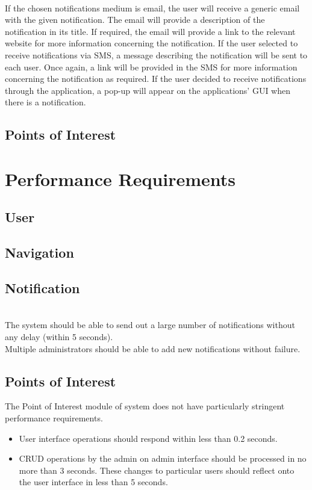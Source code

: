 \documentclass[runningheads,a4paper]{article}
\begin{document}
\mbox{}\\
If the chosen notifications medium is email, the user will receive a generic email with the given notification. The email will provide a description of the notification in its title. If required, the email will provide a link to the relevant website for more information concerning the notification. If the user selected to receive notifications via SMS, a message describing the notification will be sent to each user. Once again, a link will be provided in the SMS for more information concerning the notification as required. If the user decided to receive notifications through the application, a pop-up will appear on the applications’ GUI when there is a notification. 

\subsection{Points of Interest}


\section{Performance Requirements}

\subsection{User}
\subsection{Navigation}
\subsection{Notification}
\mbox{}\\
The system should be able to send out a large number of notifications without any delay (within 5 seconds).\\
Multiple administrators should be able to add new notifications without failure.
\subsection{Points of Interest}
The Point of Interest module of system does not have particularly stringent performance requirements.

\begin{itemize}
\item User interface operations should respond within less than 0.2 seconds.

\item CRUD operations by the admin on admin interface should be processed in no more than 3 seconds. These changes to particular users should reflect onto the user interface in less than 5 seconds.
\end{itemize}
\end{document}
